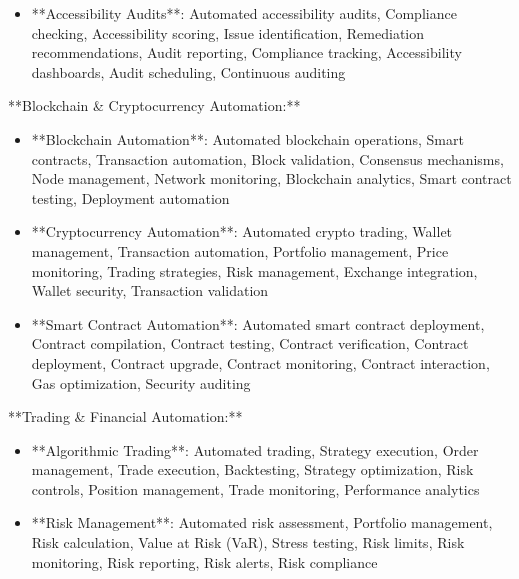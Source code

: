 \documentclass[11pt,a4paper]{article}
\begin{document}
\begin{itemize}
\item **Accessibility Audits**: Automated accessibility audits, Compliance checking, Accessibility scoring, Issue identification, Remediation recommendations, Audit reporting, Compliance tracking, Accessibility dashboards, Audit scheduling, Continuous auditing
\end{itemize}

**Blockchain \& Cryptocurrency Automation:**

\begin{itemize}
\item **Blockchain Automation**: Automated blockchain operations, Smart contracts, Transaction automation, Block validation, Consensus mechanisms, Node management, Network monitoring, Blockchain analytics, Smart contract testing, Deployment automation
\end{itemize}

\begin{itemize}
\item **Cryptocurrency Automation**: Automated crypto trading, Wallet management, Transaction automation, Portfolio management, Price monitoring, Trading strategies, Risk management, Exchange integration, Wallet security, Transaction validation
\end{itemize}

\begin{itemize}
\item **Smart Contract Automation**: Automated smart contract deployment, Contract compilation, Contract testing, Contract verification, Contract deployment, Contract upgrade, Contract monitoring, Contract interaction, Gas optimization, Security auditing
\end{itemize}

**Trading \& Financial Automation:**

\begin{itemize}
\item **Algorithmic Trading**: Automated trading, Strategy execution, Order management, Trade execution, Backtesting, Strategy optimization, Risk controls, Position management, Trade monitoring, Performance analytics
\end{itemize}

\begin{itemize}
\item **Risk Management**: Automated risk assessment, Portfolio management, Risk calculation, Value at Risk (VaR), Stress testing, Risk limits, Risk monitoring, Risk reporting, Risk alerts, Risk compliance
\end{itemize}
\end{document}
